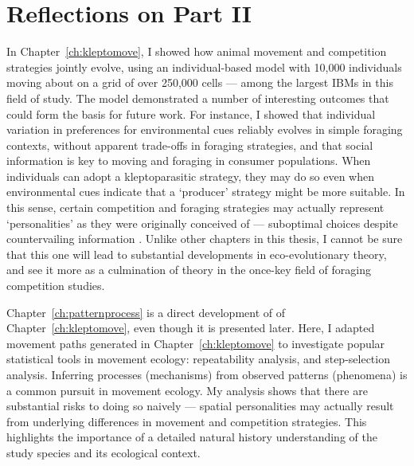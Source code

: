 \section*{Reflections on Part II}

In Chapter~\ref{ch:kleptomove}, I showed how animal movement and competition strategies jointly evolve, using an individual-based model with 10,000 individuals moving about on a grid of over 250,000 cells --- among the largest IBMs in this field of study.
The model demonstrated a number of interesting outcomes that could form the basis for future work.
For instance, I showed that individual variation in preferences for environmental cues reliably evolves in simple foraging contexts, without apparent trade-offs in foraging strategies, and that social information is key to moving and foraging in consumer populations.
When individuals can adopt a kleptoparasitic strategy, they may do so even when environmental cues indicate that a `producer' strategy \parencite{beauchamp2008} might be more suitable.
In this sense, certain competition and foraging strategies may actually represent `personalities' as they were originally conceived of --- suboptimal choices despite countervailing information \parencite{sih2004}.
Unlike other chapters in this thesis, I cannot be sure that this one will lead to substantial developments in eco-evolutionary theory, and see it more as a culmination of theory in the once-key field of foraging competition studies.

Chapter~\ref{ch:patternprocess} is a direct development of of Chapter~\ref{ch:kleptomove}, even though it is presented later.
Here, I adapted movement paths generated in Chapter~\ref{ch:kleptomove} to investigate popular statistical tools in movement ecology: repeatability analysis, and step-selection analysis.
Inferring processes (mechanisms) from observed patterns (phenomena) is a common pursuit in movement ecology.
My analysis shows that there are substantial risks to doing so naively --- spatial personalities \parencite{stuber2022} may actually result from underlying differences in movement and competition strategies.
This highlights the importance of a detailed natural history understanding of the study species and its ecological context.

